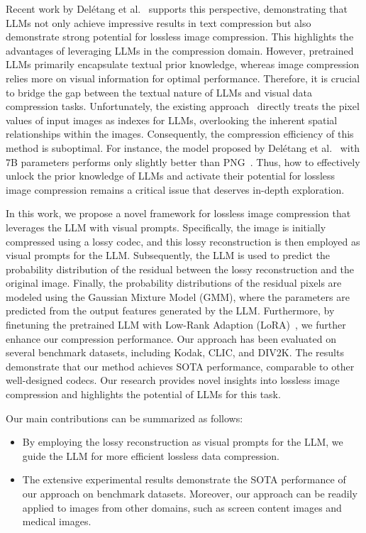 Recent work by Del{\'e}tang et al.~\cite{deletang2023language} supports this perspective, demonstrating that LLMs not only achieve impressive results in text compression but also demonstrate strong potential for lossless image compression. This highlights the advantages of leveraging LLMs in the compression domain.
However, pretrained LLMs primarily encapsulate textual prior knowledge, whereas image compression relies more on visual information for optimal performance. Therefore, it is crucial to bridge the gap between the textual nature of LLMs and  visual data compression tasks.
Unfortunately, the existing approach~\cite{deletang2023language} directly treats the pixel values of input images as indexes for LLMs, overlooking the inherent spatial relationships within the images.
Consequently, the compression efficiency of this method is suboptimal. For instance, the model proposed by Del{\'e}tang et al.~\cite{deletang2023language} with 7B parameters performs only slightly better than PNG~\cite{boutell1997png}. Thus, how to effectively unlock the prior knowledge of LLMs and activate their potential for lossless image compression remains a critical issue that deserves in-depth exploration.

In this work, we propose a novel framework for lossless image compression that leverages the LLM with visual prompts.
Specifically, the image is initially compressed using a lossy codec, and this lossy reconstruction is then employed as visual prompts for the LLM. Subsequently, the LLM is used to predict the probability distribution of the residual between the lossy reconstruction and the original image. 
Finally, the probability distributions of the residual pixels are modeled using the Gaussian Mixture Model (GMM), where the parameters are predicted from the output features generated by the LLM. Furthermore, by finetuning the pretrained LLM with Low-Rank Adaption (LoRA)~\cite{hu2021lora}, we further enhance our compression performance. Our approach has been evaluated on several benchmark datasets, including Kodak, CLIC, and DIV2K. The results demonstrate that our method achieves SOTA performance, comparable to other well-designed codecs. Our research provides novel insights into lossless image compression and highlights the potential of LLMs for this task.

Our main contributions can be summarized as follows:

\begin{itemize}
\item By employing the lossy reconstruction as visual prompts for the LLM, we guide the LLM for more efficient lossless data compression.
\item The extensive experimental results demonstrate the SOTA performance of our approach on benchmark datasets. Moreover, our approach can be readily applied to images from other domains, such as screen content images and medical images.
\end{itemize}